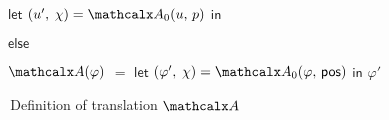 \begin{figure}[t]
\begin{enumerate}
\begin{itemize}
\begin{itemize}
      \itemx[] $\mathsf{let}$ $( u',\, \chi ) = \conv_0( u,\, p )$ $\mathsf{in}$ 
    \end{itemize}
   \itemx[] $\mathsf{else}$
   \begin{itemize}
     \itemx[] \return {}
   \end{itemize}
 \end{itemize}
\end{enumerate}
\begin{enumerate}
\itemx[\ ]
$\conv( \varphi )$ $=$ $\mathsf{let}$ $( \varphi',\, \chi ) = \conv_0( \varphi,\, \ppos )$ $\mathsf{in}$ $\varphi'$
\end{enumerate}
\caption{\,Definition of translation $\conv$}
\label{fig:A}
\end{figure}

